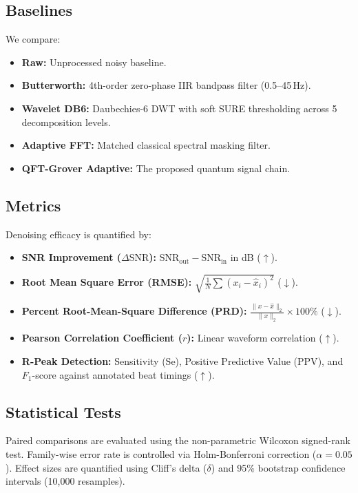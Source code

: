 \documentclass[journal,compsoc]{IEEEtran}
\begin{document}
\subsection{Baselines}
We compare:
\begin{itemize}
    \item \textbf{Raw:} Unprocessed noisy baseline.
    \item \textbf{Butterworth:} 4th-order zero-phase IIR bandpass filter (0.5--45\,Hz).
    \item \textbf{Wavelet DB6:} Daubechies-6 DWT with soft SURE thresholding across 5 decomposition levels.
    \item \textbf{Adaptive FFT:} Matched classical spectral masking filter.
    \item \textbf{QFT-Grover Adaptive:} The proposed quantum signal chain.
\end{itemize}

\subsection{Metrics}
Denoising efficacy is quantified by:
\begin{itemize}
    \item \textbf{SNR Improvement ($\Delta\text{SNR}$):} $\text{SNR}_{\text{out}} - \text{SNR}_{\text{in}}$ in dB ($\uparrow$).
    \item \textbf{Root Mean Square Error (RMSE):} $\sqrt{\frac{1}{N}\sum (x_i - \hat{x}_i)^2}$ ($\downarrow$).
    \item \textbf{Percent Root-Mean-Square Difference (PRD):} $\frac{\|x - \hat{x}\|_2}{\|x\|_2} \times 100\%$ ($\downarrow$).
    \item \textbf{Pearson Correlation Coefficient ($r$):} Linear waveform correlation ($\uparrow$).
    \item \textbf{R-Peak Detection:} Sensitivity ($\text{Se}$), Positive Predictive Value ($\text{PPV}$), and $F_1$-score against annotated beat timings ($\uparrow$).
\end{itemize}

\subsection{Statistical Tests}
Paired comparisons are evaluated using the non-parametric Wilcoxon signed-rank test. Family-wise error rate is controlled via Holm-Bonferroni correction ($\alpha = 0.05$). Effect sizes are quantified using Cliff's delta ($\delta$) and 95\% bootstrap confidence intervals (10,000 resamples).
\end{document}
